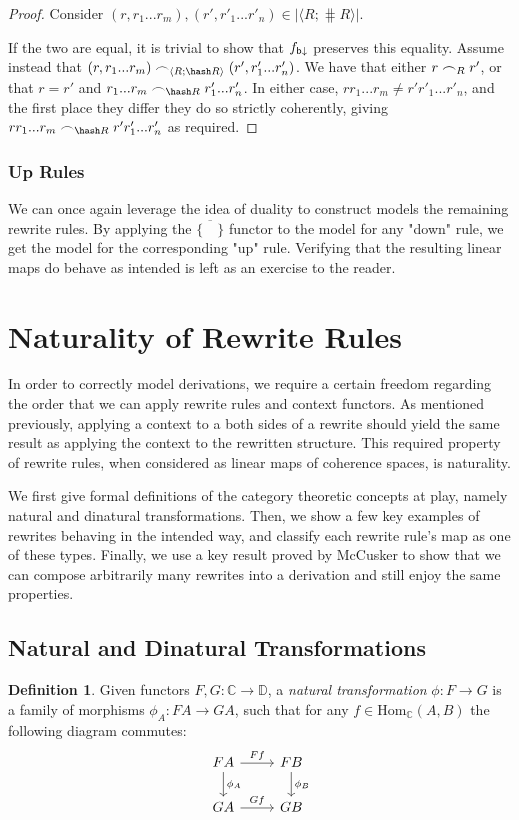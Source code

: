 \documentclass[11pt, oneside]{article}
\theoremstyle{plain}
\theoremstyle{definition}
\newtheorem{definition}[theorem]{Definition}
\newcommand{\la}{\langle}
\newcommand{\ra}{\rangle}
\newcommand{\scoh}[1][]{\mathrel{\frown}_{\ifx\\#1\\\else#1\fi}}
\begin{document}
\begin{proof}
    Consider $(r,r_1...r_m),(r',r'_1...r'_n)\in|\la R;\hash R\ra|$.

    If the two are equal, it is trivial to show that $f_{{\mathsf b}{\downarrow}}$ preserves this equality.
    Assume instead that $(r,r_1...r_m)\scoh[\la R;\hash R\ra](r',r'_1...r'_n)$.
    We have that either $r\scoh[R]r'$, or that $r=r'$ and $r_1...r_m\scoh[\hash R]r'_1...r'_n$.
    In either case, $rr_1...r_m\neq r'r'_1...r'_n$, and the first place they differ they do so strictly coherently,
    giving $rr_1...r_m\scoh[\hash R]r'r'_1...r'_n$ as required.
\end{proof}

\subsubsection{Up Rules}
We can once again leverage the idea of duality to construct models the remaining rewrite rules.
By applying the $\overline{\{\quad\}}$ functor to the model for any "down" rule, we get the model for the corresponding "up" rule.
Verifying that the resulting linear maps do behave as intended is left as an exercise to the reader.

\newpage
\section{Naturality of Rewrite Rules}
In order to correctly model derivations, we require a certain freedom regarding the order that we can apply rewrite rules and context functors.
As mentioned previously, applying a context to a both sides of a rewrite should yield the same result as applying the context to the rewritten structure.
This required property of rewrite rules, when considered as linear maps of coherence spaces, is naturality.

We first give formal definitions of the category theoretic concepts at play, namely natural and dinatural transformations. 
Then, we show a few key examples of rewrites behaving in the intended way, and classify each rewrite rule's map as one of these types.
Finally, we use a key result proved by McCusker to show that we can compose arbitrarily many rewrites into a derivation and still enjoy the same properties.

\subsection{Natural and Dinatural Transformations}
\begin{definition}
Given functors $F,G:\mathbb{C}\to\mathbb{D}$, a \textit{natural transformation} $\phi:F\to G$ is a family of morphisms $\phi_A:FA\to GA$, such that for any $f\in \text{Hom}_{\mathbb{C}}(A,B)$ the following diagram commutes:
\[
\begin{tikzcd}
    FA \arrow[r,"Ff"]\arrow[d,"\phi_A"]& FB\arrow[d,"\phi_B"] \\
    GA \arrow[r,"Gf"] & GB
\end{tikzcd}
\]
\end{definition}
\end{document}
